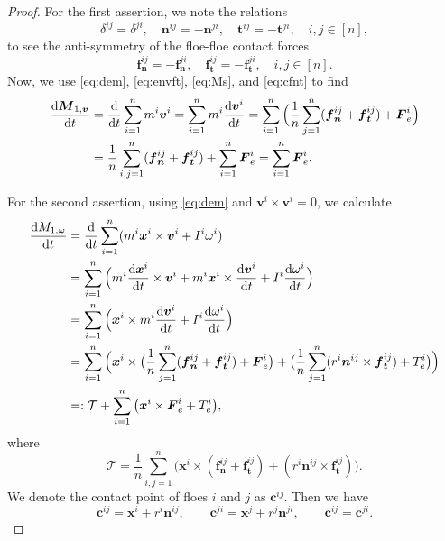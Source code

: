 \documentclass[a4paper,11pt]{article}
\numberwithin{equation}{section}
\theoremstyle{definition}
\newcommand{\bfx}{\boldsymbol{x}}
\newcommand{\bfv}{\boldsymbol{v}}
\newcommand{\bfn}{\boldsymbol{n}}
\newcommand{\bft}{\boldsymbol{t}}
\newcommand{\bff}{\boldsymbol{f}}
\newcommand{\bfF}{\boldsymbol{F}}
\newcommand{\bfM}{\boldsymbol{M}}
\newcommand{\bfc}{\boldsymbol{c}}
\def\d{{  \rm d}}
\newcommand{\T}{\mathcal{T}}
\begin{document}
%
\begin{proof}
%
For the first assertion, we note the relations 
\[ \delta^{ij} = \delta^{ji}, \quad  \bfn^{ij} = -\bfn^{ji}, \quad  \bft^{ij} = -\bft^{ji}, \quad i, j \in [n],
\]
to see the anti-symmetry of the floe-floe contact forces
\begin{equation} \label{eq:cfnt}
\bff_{\bfn}^{ij} = -\bff_{\bfn}^{ji}, \quad \bff_{\bft}^{ij} = -\bff_{\bft}^{ji}, \quad i, j \in [n].
 \end{equation}
Now, we use \eqref{eq:dem}, \eqref{eq:envft}, \eqref{eq:Ms}, and  \eqref{eq:cfnt} to find 
\begin{align*}
\begin{aligned}
    \frac{\d \bfM_{1,\bfv}}{\d t} & = \frac{\d}{\d t} \sum_{i=1}^n m^i \bfv^i  = \sum_{i=1}^n m^i \frac{\d \bfv^i}{\d t}  =  \sum_{i=1}^n \Big( \frac{1}{n} \sum_{j=1}^{n} (\bff_{\bfn}^{ij} + \bff_{\bft}^{ij}) + \bfF^i_e \Big) \\
    &= \frac{1}{n} \sum_{i, j=1}^{n} (\bff_{\bfn}^{ij} + \bff_{\bft}^{ij})  + \sum_{i=1}^{n} \bfF^i_e =\sum_{i=1}^{n} \bfF^i_e. 
\end{aligned}
\end{align*}
%

\noindent
For the second assertion, using \eqref{eq:dem} and $\bfv^i \times \bfv^i=0$, we calculate
\begin{align*}
\begin{aligned}
    \frac{\d M_{1,\omega}}{\d t} & = \frac{\d}{\d t} \sum_{i=1}^n (m^i \bfx^i \times \bfv^i + I^i \omega^i) \\
    & = \sum_{i=1}^n \Big(m^i \frac{\d \bfx^i}{\d t}  \times \bfv^i + m^i \bfx^i \times \frac{\d \bfv^i}{\d t} + I^i \frac{\d \omega^i}{\d t} \Big) \\
    & = \sum_{i=1}^n \Big( \bfx^i \times m^i \frac{\d \bfv^i}{\d t} + I^i \frac{\d \omega^i}{\d t} \Big) \\
    & = \sum_{i=1}^n \Big( \bfx^i \times \big(\frac{1}{n} \sum_{j=1}^{n}(\bff_{\bfn}^{ij} + \bff_{\bft}^{ij}) + \bfF^i_e \big) +  \big( \frac{1}{n} \sum_{j=1}^{n} ( r^i\bfn^{ij}\times \bff_{\bft}^{ij})  + T^i_e \big) \Big) \\
    & =: \T+ \sum_{i=1}^{n} \big( \bfx^i \times \bfF^i_e
      + T^i_e  \big),
\end{aligned}
\end{align*}
%
where 
\begin{equation*}
\T  = \frac{1}{n}  \sum_{i,j=1}^n \big( \bfx^i \times (\bff_{\bfn}^{ij} + \bff_{\bft}^{ij}) + ( r^i\bfn^{ij}\times \bff_{\bft}^{ij}) \big).
\end{equation*}
%
We denote the contact point of floes $i$ and $j$ as $\bfc^{ij}$. Then we have 
\begin{equation}\label{eq:cij}
    \bfc^{ij} = \bfx^i + r^i \bfn^{ij}, \qquad \bfc^{ji} = \bfx^j + r^j \bfn^{ji}, \qquad \bfc^{ij} = \bfc^{ji}.
\end{equation}


\end{proof}
\end{document}
